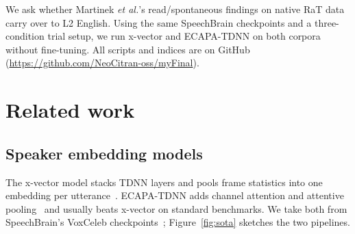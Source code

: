 \documentclass[cameraready]{Interspeech}
\begin{document}
We ask whether Martinek \textit{et al.}'s read/spontaneous findings on native RaT data~\cite{martinek2025read} carry over to L2 English. Using the same SpeechBrain checkpoints and a three-condition trial setup, we run x-vector and ECAPA-TDNN on both corpora without fine-tuning. All scripts and indices are on GitHub (\url{https://github.com/NeoCitran-oss/myFinal}).

\section{Related work}
\label{sec:related}

\subsection{Speaker embedding models}

The x-vector model stacks TDNN layers and pools frame statistics into one embedding per utterance~\cite{snyder2018xvector}. ECAPA-TDNN adds channel attention and attentive pooling~\cite{desplanques2020ecapa} and usually beats x-vector on standard benchmarks. We take both from SpeechBrain's VoxCeleb checkpoints~\cite{ravanelli2021speechbrain,chung2018voxceleb}; Figure~\ref{fig:sota} sketches the two pipelines.
\end{document}
